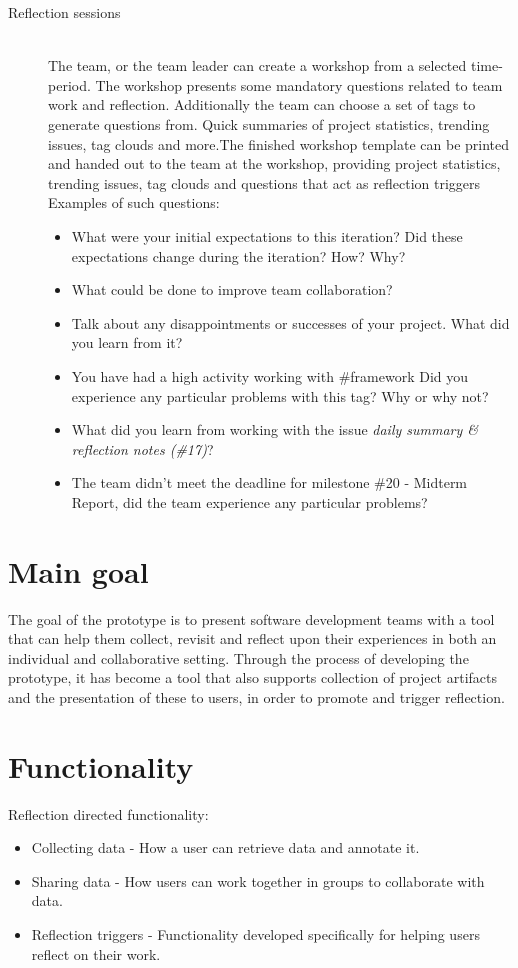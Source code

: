 \begin{description}
	\item[Reflection sessions] \hfill \\
	The team, or the team leader can create a workshop from a selected time-period. The workshop presents some mandatory questions
	related to team work and reflection. Additionally the team can choose a set of tags to generate questions from. Quick summaries of project statistics, trending issues, tag clouds and more.The finished workshop template can be printed and
	handed out to the team at the workshop, providing project statistics, trending issues, tag clouds and questions that act as reflection triggers\\
	Examples of such questions: 
		\begin{itemize}
			\item What were your initial expectations to this iteration? Did these expectations change during the iteration? How? Why?
			\item What could be done to improve team collaboration?
			\item Talk about any disappointments or successes of your project. What did you learn from it?
			\item You have had a high activity working with \#framework Did you experience any particular problems with this tag? Why or why not?
			\item What did you learn from working with the issue \textit{daily summary \& reflection notes (\#17)}?
			\item The team didn't meet the deadline for milestone \#20 - Midterm Report, did the team experience any particular problems?
		\end{itemize}
\end{description}

\section{Main goal}
The goal of the prototype is to present software development teams with a tool that can help them collect, revisit and reflect upon their experiences in both an individual and collaborative setting. Through the process of developing the prototype, it has become a tool that also supports collection of project artifacts and the presentation of these to users, in order to promote and trigger reflection. 

\section{Functionality}
Reflection directed functionality:
\begin{itemize}
\item Collecting data - How a user can retrieve data and annotate it. 
\item Sharing data - How users can work together in groups to collaborate with data. 
\item Reflection triggers - Functionality developed specifically for helping users reflect on their work.
\end{itemize}

